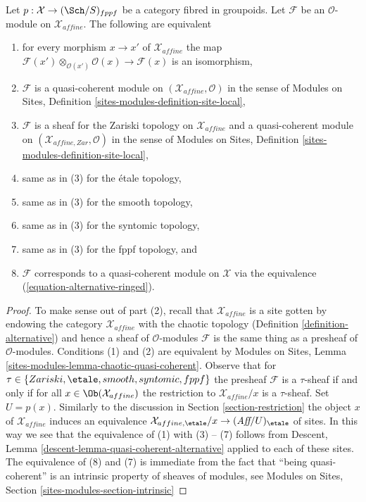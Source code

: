 \begin{lemma}
\label{lemma-quasi-coherent-alternative}
Let $p : \mathcal{X} \to (\Sch/S)_{fppf}$ be a category fibred in groupoids.
Let $\mathcal{F}$ be an $\mathcal{O}$-module on $\mathcal{X}_{affine}$.
The following are equivalent
\begin{enumerate}
\item for every morphism $x \to x'$ of $\mathcal{X}_{affine}$ the map
$\mathcal{F}(x') \otimes_{\mathcal{O}(x')} \mathcal{O}(x) \to \mathcal{F}(x)$
is an isomorphism,
\item $\mathcal{F}$ is a quasi-coherent module on
$(\mathcal{X}_{affine}, \mathcal{O})$ in the sense of
Modules on Sites, Definition \ref{sites-modules-definition-site-local},
\item $\mathcal{F}$ is a sheaf for the Zariski topology on
$\mathcal{X}_{affine}$ and a quasi-coherent module on
$(\mathcal{X}_{affine, Zar}, \mathcal{O})$ in the sense of
Modules on Sites, Definition \ref{sites-modules-definition-site-local},
\item same as in (3) for the \'etale topology,
\item same as in (3) for the smooth topology,
\item same as in (3) for the syntomic topology,
\item same as in (3) for the fppf topology, and
\item $\mathcal{F}$ corresponds to a quasi-coherent module
on $\mathcal{X}$ via the equivalence (\ref{equation-alternative-ringed}).
\end{enumerate}
\end{lemma}

\begin{proof}
To make sense out of part (2), recall that $\mathcal{X}_{affine}$ is a site
gotten by endowing the category $\mathcal{X}_{affine}$ with the chaotic
topology (Definition \ref{definition-alternative}) and hence a sheaf
of $\mathcal{O}$-modules $\mathcal{F}$ is the same thing as
a presheaf of $\mathcal{O}$-modules. Conditions (1) and (2)
are equivalent by Modules on Sites, Lemma
\ref{sites-modules-lemma-chaotic-quasi-coherent}.
Observe that for $\tau \in \{Zariski, \etale, smooth, syntomic, fppf\}$
the presheaf $\mathcal{F}$ is a $\tau$-sheaf if and only if
for all $x \in \Ob(\mathcal{X}_{affine})$ the restriction
to $\mathcal{X}_{affine}/x$ is a $\tau$-sheaf. Set $U = p(x)$.
Similarly to the discussion in Section \ref{section-restriction}
the object $x$ of $\mathcal{X}_{affine}$ induces an equivalence
$\mathcal{X}_{affine, \etale}/x \to (\textit{Aff}/U)_\etale$ of sites.
In this way we see that the equivalence of (1) with (3) -- (7)
follows from Descent, Lemma \ref{descent-lemma-quasi-coherent-alternative}
applied to each of these sites. The equivalence of (8) and (7)
is immediate from the fact that ``being quasi-coherent'' is an
intrinsic property of sheaves of modules, see
Modules on Sites, Section \ref{sites-modules-section-intrinsic}
\end{proof}

